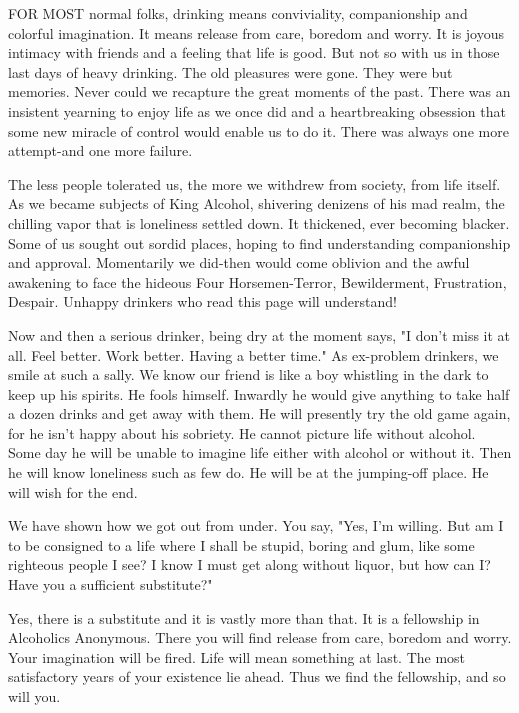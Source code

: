 
\bbChapterPreamble


\begin{biblechapter}
    FOR MOST normal folks, 
    drinking means conviviality, companionship 
    and colorful imagination.
\verse It means release from care, boredom and worry.
It is joyous intimacy with friends and a feeling that life is good.  But not so with us in those last days of heavy drinking.  The old pleasures were gone.  They were but memories.  Never could we recapture the great moments of the past.  There was an insistent yearning to enjoy life as we once did and a heartbreaking obsession that some new miracle of control would enable us to do it.  There was always one more attempt-and one more failure.

The less people tolerated us, the more we withdrew from society, from life itself.  As we became subjects of King Alcohol, shivering denizens of his mad realm, the chilling vapor that is loneliness settled down.  It thickened, ever becoming blacker.  Some of us sought out sordid places, hoping to find understanding companionship and approval.  Momentarily we did-then would come oblivion and the awful awakening to face the hideous Four Horsemen-Terror, Bewilderment, Frustration, Despair.  Unhappy drinkers who read this page will understand!

Now and then a serious drinker, being dry at the moment says, "I don't miss it at all.  Feel better.  Work better.  Having a better time."  As ex-problem drinkers, we smile at such a sally.  We know our friend is like a boy whistling in the dark to keep up his spirits.  He fools himself.  Inwardly he would give anything to take half a dozen drinks and get away with them.  He will presently try the old game again, for he isn't happy about his sobriety.  He cannot picture life without alcohol.  Some day he will be unable to imagine life either with alcohol or without it.  Then he will know loneliness such as few do.  He will be at the jumping-off place.  He will wish for the end.

We have shown how we got out from under.  You say, "Yes, I'm willing.  But am I to be consigned to a life where I shall be stupid, boring and glum, like some righteous people I see?  I know I must get along without liquor, but how can I?  Have you a sufficient substitute?"

Yes, there is a substitute and it is vastly more than that.  It is a fellowship in Alcoholics Anonymous.  There you will find release from care, boredom and worry.  Your imagination will be fired.  Life will mean something at last.  The most satisfactory years of your existence lie ahead.  Thus we find the fellowship, and so will you.


\end{biblechapter}
